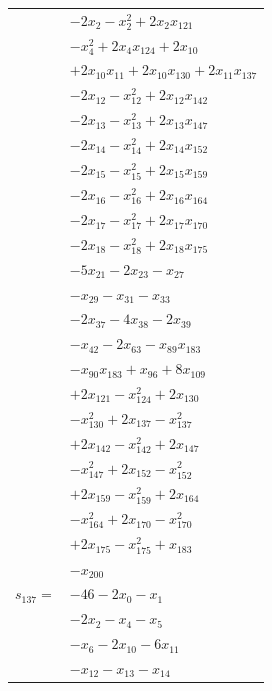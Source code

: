 \begin{longtable}{@{}r@{\;}l@{}}
 & \(\displaystyle -2x_{2} -x_{2}^{2} +2x_{2}x_{121}\) \\
 & \(\displaystyle -x_{4}^{2} +2x_{4}x_{124} +2x_{10}\) \\
 & \(\displaystyle +2x_{10}x_{11} +2x_{10}x_{130} +2x_{11}x_{137}\) \\
 & \(\displaystyle -2x_{12} -x_{12}^{2} +2x_{12}x_{142}\) \\
 & \(\displaystyle -2x_{13} -x_{13}^{2} +2x_{13}x_{147}\) \\
 & \(\displaystyle -2x_{14} -x_{14}^{2} +2x_{14}x_{152}\) \\
 & \(\displaystyle -2x_{15} -x_{15}^{2} +2x_{15}x_{159}\) \\
 & \(\displaystyle -2x_{16} -x_{16}^{2} +2x_{16}x_{164}\) \\
 & \(\displaystyle -2x_{17} -x_{17}^{2} +2x_{17}x_{170}\) \\
 & \(\displaystyle -2x_{18} -x_{18}^{2} +2x_{18}x_{175}\) \\
 & \(\displaystyle -5x_{21} -2x_{23} -x_{27}\) \\
 & \(\displaystyle -x_{29} -x_{31} -x_{33}\) \\
 & \(\displaystyle -2x_{37} -4x_{38} -2x_{39}\) \\
 & \(\displaystyle -x_{42} -2x_{63} -x_{89}x_{183}\) \\
 & \(\displaystyle -x_{90}x_{183} +x_{96} +8x_{109}\) \\
 & \(\displaystyle +2x_{121} -x_{124}^{2} +2x_{130}\) \\
 & \(\displaystyle -x_{130}^{2} +2x_{137} -x_{137}^{2}\) \\
 & \(\displaystyle +2x_{142} -x_{142}^{2} +2x_{147}\) \\
 & \(\displaystyle -x_{147}^{2} +2x_{152} -x_{152}^{2}\) \\
 & \(\displaystyle +2x_{159} -x_{159}^{2} +2x_{164}\) \\
 & \(\displaystyle -x_{164}^{2} +2x_{170} -x_{170}^{2}\) \\
 & \(\displaystyle +2x_{175} -x_{175}^{2} +x_{183}\) \\
 & \(\displaystyle -x_{200}\) \\[3pt]
\(s_{137}=\) & \(\displaystyle -46 -2x_{0} -x_{1}\) \\
 & \(\displaystyle -2x_{2} -x_{4} -x_{5}\) \\
 & \(\displaystyle -x_{6} -2x_{10} -6x_{11}\) \\
 & \(\displaystyle -x_{12} -x_{13} -x_{14}\) \\

\end{longtable}
